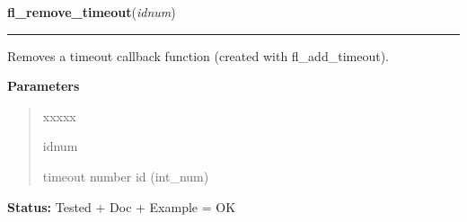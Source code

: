     \vspace{0.5ex}

\hspace{.8\funcindent}\begin{boxedminipage}{\funcwidth}

    \raggedright \textbf{fl\_remove\_timeout}(\textit{idnum})

    \vspace{-1.5ex}

    \rule{\textwidth}{0.5\fboxrule}
\setlength{\parskip}{2ex}
    Removes a timeout callback function (created with fl\_add\_timeout).

\setlength{\parskip}{1ex}
      \textbf{Parameters}
      \vspace{-1ex}

      \begin{quote}
        \begin{Ventry}{xxxxx}

          \item[idnum]

          timeout number id (int\_num)

        \end{Ventry}

      \end{quote}

\textbf{Status:} Tested + Doc + Example = OK



    \end{boxedminipage}

    \label{xformslib:library:fl_library_version}

    \vspace{0.5ex}

